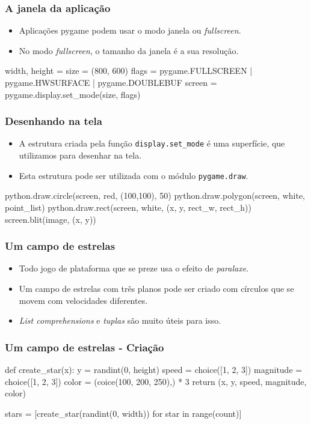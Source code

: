 \begin{frame}[fragile]
    \frametitle{A janela da aplicação}

    \begin{itemize}
        \item Aplicações pygame podem usar o modo janela ou \textit{fullscreen}.
        \item No modo \textit{fullscreen}, o tamanho da janela é a sua resolução.
    \end{itemize}
    \begin{python}
    width, height = size = (800, 600)
    flags = pygame.FULLSCREEN | pygame.HWSURFACE | pygame.DOUBLEBUF
    screen = pygame.display.set_mode(size, flags)
    \end{python}
\end{frame}

\begin{frame}[fragile]
    \frametitle{Desenhando na tela}
    \begin{itemize}
        \item A estrutura criada pela função \texttt{display.set\_mode} é uma
        superfície, que utilizamos para desenhar na tela.
        \item Esta estrutura pode ser utilizada com o módulo \texttt{pygame.draw}.
    \end{itemize}
    \vfill
    \begin{python}
        python.draw.circle(screen, red, (100,100), 50)
        python.draw.polygon(screen, white, point_list)
        python.draw.rect(screen, white, (x, y, rect_w, rect_h))
        screen.blit(image, (x, y))
    \end{python}
\end{frame}

\begin{frame}
    \frametitle{Um campo de estrelas}

    \begin{itemize}
        \item Todo jogo de plataforma que se preze usa o efeito de \textit{paralaxe}.
        \item Um campo de estrelas com três planos pode ser criado com círculos
        que se movem com velocidades diferentes.
        \item \textit{List comprehensions} e \textit{tuplas} são muito úteis para isso.
    \end{itemize}
\end{frame}

\begin{frame}[fragile]
    \frametitle{Um campo de estrelas - Criação}

    \begin{python}
    def create_star(x):
        y = randint(0, height)
        speed = choice([1, 2, 3])
        magnitude = choice([1, 2, 3])
        color = (coice(100, 200, 250),) * 3
        return (x, y, speed, magnitude, color)

    stars = [create_star(randint(0, width)) for star in range(count)]
    \end{python}
\end{frame}


